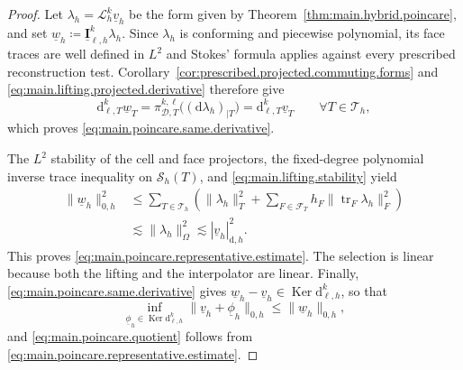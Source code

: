 \documentclass[a4paper,11pt]{article}
\theoremstyle{definition}
\newcommand{\DIFF}{\mathrm{d}}
\newcommand{\Sh}{\mathcal{S}_h}
\newcommand{\uI}[2]{\underline{\boldsymbol{I}}_{\ell,#2}^{#1}}
\newcommand{\piD}[2]{\pi_{\mathcal D,#1}^{#2,\ell}}
\newcommand{\trc}{\operatorname{tr}}
\newcommand{\Ker}{\operatorname{Ker}}
\begin{document}
\begin{proof}
Let $\lambda_h=\mathcal L_h^k\underline v_h$ be the form given by Theorem~\ref{thm:main.hybrid.poincare}, and set $\underline w_h\coloneqq\uI{k}{h}\lambda_h$.
Since $\lambda_h$ is conforming and piecewise polynomial, its face traces are well defined in $L^2$ and Stokes' formula applies against every prescribed reconstruction test.
Corollary~\ref{cor:prescribed.projected.commuting.forms} and \eqref{eq:main.lifting.projected.derivative} therefore give
\[
  \DIFF_{\ell,T}^{k}\underline w_T
  =
  \piD{T}{k}\bigl((\DIFF\lambda_h)_{|T}\bigr)
  =
  \DIFF_{\ell,T}^{k}\underline v_T
  \qquad\forall T\in\mathcal T_h,
\]
which proves \eqref{eq:main.poincare.same.derivative}.

The $L^2$ stability of the cell and face projectors, the fixed-degree polynomial inverse trace inequality on $\Sh(T)$, and \eqref{eq:main.lifting.stability} yield
\[
\begin{aligned}
  \|\underline w_h\|_{0,h}^2
  &\leq
  \sum_{T\in\mathcal T_h}
  \left(
    \|\lambda_h\|_T^2
    +
    \sum_{F\in\mathcal F_T}
    h_F\|\trc_F\lambda_h\|_F^2
  \right)
  \\
  &\lesssim
  \|\lambda_h\|_\Omega^2
  \lesssim
  |\underline v_h|_{\DIFF,h}^2.
\end{aligned}
\]
This proves \eqref{eq:main.poincare.representative.estimate}.
The selection is linear because both the lifting and the interpolator are linear.
Finally, \eqref{eq:main.poincare.same.derivative} gives $\underline w_h-\underline v_h\in\Ker\DIFF_{\ell,h}^{k}$, so that
\[
  \inf_{\underline\phi_h\in\Ker\DIFF_{\ell,h}^{k}}
  \|\underline v_h+\underline\phi_h\|_{0,h}
  \leq
  \|\underline w_h\|_{0,h},
\]
and \eqref{eq:main.poincare.quotient} follows from \eqref{eq:main.poincare.representative.estimate}.
\end{proof}
\end{document}
